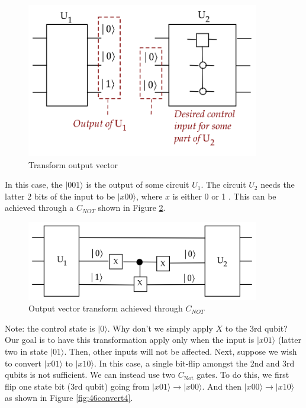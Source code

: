 \documentclass[main.tex]{subfiles}
\begin{document}
    \begin{figure}
        \centering
        \includegraphics[width=4in]{notes/figs/n08/44convert.png}
        \caption{Transform output vector}
        \label{fig:44convert}
    \end{figure}
    
    In this case, the $|001\rangle$ is the output of some circuit $U_{1}$. The circuit $U_{2}$ needs the latter 2 bits of the input to be $|x 00\rangle$, where $x$ is either 0 or 1 . This can be achieved through a $C_{NOT}$ shown in Figure \ref{fig:45convert2}.
    
    \begin{figure}
        \centering
        \includegraphics[width=4in]{notes/figs/n08/45convert2.png}
        \caption{Output vector transform achieved through $C_{NOT}$}
        \label{fig:45convert2}
    \end{figure}
    
    Note: the control state is $|0\rangle$. Why don't we simply apply $X$ to the 3rd qubit? Our goal is to have this transformation apply only when the input is $|x 01\rangle$ (latter two in state $|01\rangle$. Then, other inputs will not be affected. Next, suppose we wish to convert $|x 01\rangle$ to $|x 10\rangle$. In this case, a single bit-flip amongst the 2nd and 3rd qubits is not sufficient. We can instead use two $C_{\text {Not}}$ gates. To do this, we first flip one state bit (3rd qubit) going from $|x 01\rangle \rightarrow|x 00\rangle$. And then $|x 00\rangle \rightarrow|x 10\rangle$ as shown in Figure \ref{fig:46convert4}.
    
\end{document}
